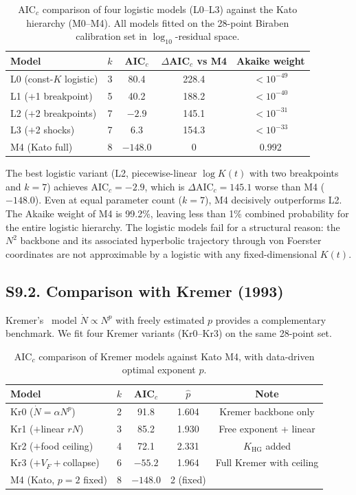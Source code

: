 \documentclass[11pt]{article}
\begin{document}
\begin{table}[H]
\centering
\caption{AIC$_c$ comparison of four logistic models (L0--L3) against the Kato hierarchy (M0--M4). All models fitted on the 28-point Biraben calibration set in $\log_{10}$-residual space.}
\label{tab:S9_logistic_aic}
\begin{tabular}{lcccc}
\toprule
Model & $k$ & AIC$_c$ & $\Delta$AIC$_c$ vs M4 & Akaike weight \\
\midrule
L0 (const-$K$ logistic) & 3 & 80.4 & 228.4 & $<10^{-49}$ \\
L1 ($+$1 breakpoint) & 5 & 40.2 & 188.2 & $<10^{-40}$ \\
L2 ($+$2 breakpoints) & 7 & $-2.9$ & 145.1 & $<10^{-31}$ \\
L3 ($+$2 shocks) & 7 & $6.3$ & 154.3 & $<10^{-33}$ \\
\midrule
M4 (Kato full) & 8 & $-148.0$ & 0 & 0.992 \\
\bottomrule
\end{tabular}
\end{table}

\noindent
The best logistic variant (L2, piecewise-linear $\log K(t)$ with two breakpoints and $k=7$) achieves AIC$_c=-2.9$, which is $\Delta\mathrm{AIC}_c=145.1$ worse than M4 ($-148.0$). Even at equal parameter count ($k=7$), M4 decisively outperforms L2. The Akaike weight of M4 is 99.2\%, leaving less than 1\% combined probability for the entire logistic hierarchy. The logistic models fail for a structural reason: the $N^2$ backbone and its associated hyperbolic trajectory through von Foerster coordinates are not approximable by a logistic with any fixed-dimensional $K(t)$.

\subsection*{S9.2. Comparison with Kremer (1993)}

Kremer's~\cite{kremer1993} model $\dot{N}\propto N^p$ with freely estimated $p$ provides a complementary benchmark. We fit four Kremer variants (Kr0--Kr3) on the same 28-point set.

\begin{table}[H]
\centering
\caption{AIC$_c$ comparison of Kremer models against Kato M4, with data-driven optimal exponent $\hat{p}$.}
\label{tab:S9_kremer_aic}
\begin{tabular}{lcccc}
\toprule
Model & $k$ & AIC$_c$ & $\hat{p}$ & Note \\
\midrule
Kr0 ($\dot{N}=\alpha N^p$) & 2 & 91.8 & 1.604 & Kremer backbone only \\
Kr1 ($+$linear $rN$) & 3 & 85.2 & 1.930 & Free exponent + linear \\
Kr2 ($+$food ceiling) & 4 & 72.1 & 2.331 & $K_{\mathrm{HG}}$ added \\
Kr3 ($+V_F+$collapse) & 6 & $-55.2$ & 1.964 & Full Kremer with ceiling \\
\midrule
M4 (Kato, $p=2$ fixed) & 8 & $-148.0$ & 2 (fixed) & \\
\bottomrule
\end{tabular}
\end{table}
\end{document}
